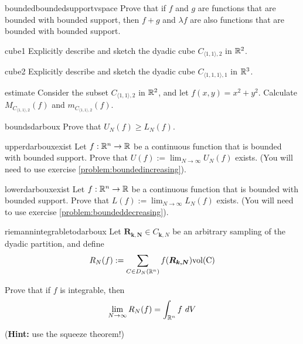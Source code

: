 \begin{problem}{boundedboundedsupportvspace}
    Prove that if $f$ and $g$ are functions that are bounded with bounded support, then $f+g$ and $\lambda f$ are also functions that are bounded with bounded support.
\end{problem}

\begin{problem}{cube1}
    Explicitly describe and sketch the dyadic cube $C_{\langle1,1\rangle,2}$ in $\mathbb{R}^2$.
\end{problem}

\begin{problem}{cube2}
    Explicitly describe and sketch the dyadic cube $C_{\langle1,1,1\rangle,1}$ in $\mathbb{R}^3$.
\end{problem}

\begin{problem}{estimate}
    Consider the subset $C_{\langle1,1\rangle,2}$ in $\mathbb{R}^2$, and let $f(x,y) = x^2 + y^2$.  Calculate $M_{C_{\langle1,1\rangle,2}}(f)$ and $m_{C_{\langle1,1\rangle,2}}(f)$.
\end{problem}


\begin{problem}{boundsdarboux}
    Prove that $U_N(f) \geq L_N(f)$.
\end{problem}

\begin{problem}{upperdarbouxexist}
    Let $f: \mathbb{R}^n \to \mathbb{R}$ be a continuous function that is bounded with bounded support. Prove that $U(f) := \lim_{N \to \infty} U_N(f)$ exists.  (You will need to use exercise \ref{problem:boundedincreasing}).
    
\end{problem}

\begin{problem}{lowerdarbouxexist}
    Let $f: \mathbb{R}^n \to \mathbb{R}$ be a continuous function that is bounded with bounded support. Prove that $L(f) := \lim_{N \to \infty} L_N(f)$ exists. (You will need to use exercise \ref{problem:boundeddecreasing}).
\end{problem}

\begin{problem}{riemannintegrabletodarboux}
    Let $\bm{R_{k,N}} \in C_{\bm{k},N}$ be an arbitrary sampling of the dyadic partition, and define 
    $$R_N(f) := \sum_{C \in D_N(\mathbb{R}^n)} f(\bm{R_{k,N}}) \textnormal{vol(C)}$$
    
    Prove that if $f$ is integrable, then
    $$\lim_{N\to\infty} R_N(f) = \int_{\mathbb{R}^n}f \ dV $$

    (\textbf{Hint:} use the squeeze theorem!)
\end{problem}


